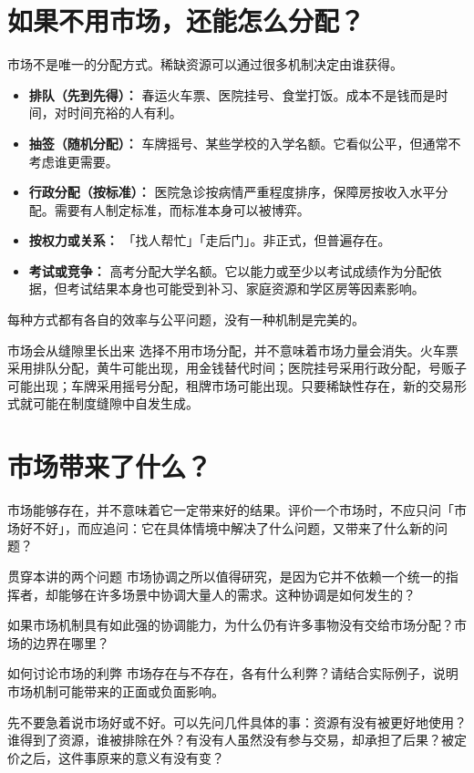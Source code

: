 \documentclass[10pt,a4paper]{ctexart}
\begin{document}
\section{如果不用市场，还能怎么分配？}

市场不是唯一的分配方式。稀缺资源可以通过很多机制决定由谁获得。

\begin{itemize}
  \item \textbf{排队（先到先得）：} 春运火车票、医院挂号、食堂打饭。成本不是钱而是时间，对时间充裕的人有利。
  \item \textbf{抽签（随机分配）：} 车牌摇号、某些学校的入学名额。它看似公平，但通常不考虑谁更需要。
  \item \textbf{行政分配（按标准）：} 医院急诊按病情严重程度排序，保障房按收入水平分配。需要有人制定标准，而标准本身可以被博弈。
  \item \textbf{按权力或关系：} 「找人帮忙」「走后门」。非正式，但普遍存在。
  \item \textbf{考试或竞争：} 高考分配大学名额。它以能力或至少以考试成绩作为分配依据，但考试结果本身也可能受到补习、家庭资源和学区房等因素影响。
\end{itemize}

每种方式都有各自的效率与公平问题，没有一种机制是完美的。

\begin{insightbox}{市场会从缝隙里长出来}
选择不用市场分配，并不意味着市场力量会消失。火车票采用排队分配，黄牛可能出现，用金钱替代时间；医院挂号采用行政分配，号贩子可能出现；车牌采用摇号分配，租牌市场可能出现。只要稀缺性存在，新的交易形式就可能在制度缝隙中自发生成。
\end{insightbox}

\section{市场带来了什么？}

市场能够存在，并不意味着它一定带来好的结果。评价一个市场时，不应只问「市场好不好」，而应追问：它在具体情境中解决了什么问题，又带来了什么新的问题？

\begin{conceptbox}{贯穿本讲的两个问题}
市场协调之所以值得研究，是因为它并不依赖一个统一的指挥者，却能够在许多场景中协调大量人的需求。这种协调是如何发生的？

如果市场机制具有如此强的协调能力，为什么仍有许多事物没有交给市场分配？市场的边界在哪里？
\end{conceptbox}

\begin{discussionbox}{如何讨论市场的利弊}
市场存在与不存在，各有什么利弊？请结合实际例子，说明市场机制可能带来的正面或负面影响。

先不要急着说市场好或不好。可以先问几件具体的事：资源有没有被更好地使用？谁得到了资源，谁被排除在外？有没有人虽然没有参与交易，却承担了后果？被定价之后，这件事原来的意义有没有变？
\end{discussionbox}
\end{document}
